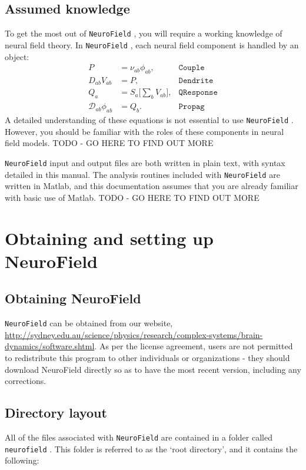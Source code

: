 \documentclass[12pt,a4paper]{article}
\newcommand{\type}[1]{{\small\small\tt #1} }
\newcommand{\NF}[0]{\type{NeuroField}}
\begin{document}
\subsection*{Assumed knowledge}
To get the most out of \NF, you will require a working knowledge of neural field theory. In \NF, each neural field component is handled by an object:
\begin{align*}
	P &= \nu_{ab}\phi_{ab}, & \mathtt{Couple}\\
	D_{ab}V_{ab} &= P, & \mathtt{Dendrite}\\
	Q_a &= S_a \big[\sum_b V_{ab} \big], & \mathtt{QResponse}\\
	\mathcal{D}_{ab}\phi_{ab} &= Q_b.&  \mathtt{Propag}
\end{align*}
A detailed understanding of these equations is not essential to use \NF. However, you should be familiar with the roles of these components in neural field models. TODO - GO HERE TO FIND OUT MORE

\NF input and output files are both written in plain text, with syntax detailed in this manual. The analysis routines included with \NF are written in Matlab, and this documentation assumes that you are already familiar with basic use of Matlab. TODO - GO HERE TO FIND OUT MORE

\section{Obtaining and setting up NeuroField}
\label{sec:obtain}

\subsection{Obtaining NeuroField}

\NF can be obtained from our website, \url{http://sydney.edu.au/science/physics/research/complex-systems/brain-dynamics/software.shtml}. As per the license agreement, users are not permitted to redistribute this program to other individuals or organizations - they should download NeuroField directly so as to have the most recent version, including any corrections. 

\subsection{Directory layout}

All of the files associated with \NF are contained in a folder called \type{neurofield}. This folder is referred to as the `root directory', and it contains the following:
\end{document}
